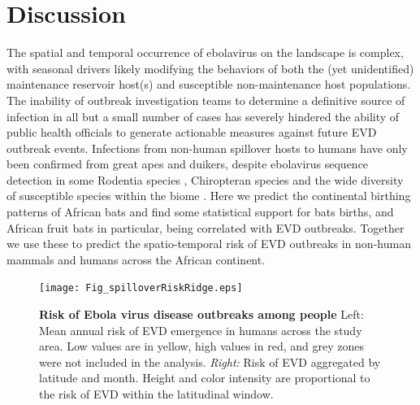 \documentclass[a4paper,twoside, onecolumn]{article}
\begin{document}
	\section*{Discussion}
	The spatial and temporal occurrence of ebolavirus on the landscape is complex, with seasonal drivers likely modifying the behaviors of both the (yet unidentified) maintenance reservoir host(s) and susceptible non-maintenance host populations. The inability of outbreak investigation teams to determine a definitive source of infection in all but a small number of cases has severely hindered the ability of public health officials to generate actionable measures against future EVD outbreak events. Infections from non-human spillover hosts to humans have only been confirmed from great apes and duikers, despite ebolavirus sequence detection in some Rodentia species \cite{Morvan1999}, Chiropteran species and the wide diversity of susceptible species within the biome \cite{Leroy2004,Swanepoel1996}. Here we predict the continental birthing patterns of African bats and find some statistical support for bats births, and African fruit bats in particular, being correlated with EVD outbreaks. Together we use these to predict the spatio-temporal risk of EVD outbreaks in non-human mammals and humans across the African continent. \par
	\begin{figure}[h!]
		\centering
		\texttt{[image: Fig\_spilloverRiskRidge.eps]}
		\caption{\textbf{Risk of Ebola virus disease outbreaks among people} Left: Mean annual risk of EVD emergence in humans across the study area. Low values are in yellow, high values in red, and grey zones were not included in the analysis. \textit{Right:} Risk of EVD aggregated by latitude and month. Height and color intensity are proportional to the risk of EVD within the latitudinal window.}
		\label{fig:F_ridge_risk}
	\end{figure}
\end{document}
